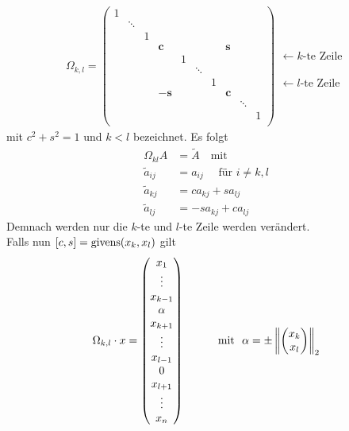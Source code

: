 \begin{gather}
  \Omega _{k,l} = \begin{pmatrix}
    1 &&&&&&&&& \\
    & \ddots\\
    && 1\\
    &&& \mathbf{c} &&&& \mathbf{s} \\
    &&&& 1\\
    &&&&& \ddots \\
    &&&&&& 1\\
    &&& -\mathbf{s} &&&& \mathbf{c} \\
    &&&&&&&& \ddots \\
    &&&&&&&&& 1\\
  \end{pmatrix}
  \begin{array}{l}
    \\   \leftarrow \text{$k$-te Zeile}
    \\ \\ \\ \\ \leftarrow \text{$l$-te Zeile}
  \end{array}
  \label{IV.4.5}
\end{gather}
mit $c^2+s^2=1$ und $k<l$ bezeichnet.
Es folgt
\begin{align*}
  \Omega_{kl} A &= \widetilde{A} \quad \text{mit} \\
  \widetilde{a}_{ij}  &= a_{ij} \quad \text{ für } i\neq k,l \\
  \widetilde{a}_{kj} & = ca_{kj}+sa_{lj} \\
  \widetilde{a}_{lj} & = -sa_{kj} + ca_{lj}
\end{align*}
Demnach werden nur die $k$-te und $l$-te Zeile werden verändert. \\
Falls nun $[c,s] = \operatorname{givens}(x_k, x_l)$ gilt
\begin{gather}
  \Omega_{k,l}\cdot x = \begin{pmatrix}
    x_1 \\ \vdots\\x_{k-1} \\\alpha \\ x_{k+1}
    \\\vdots \\
    x_{l-1} \\ 0 \\x_{l+1} \\\vdots \\x_n
  \end{pmatrix}
  \qquad
  \quad \text{mit~~}
  \alpha = \pm \nn[  \begin{pmatrix} x_k \\ x_l\end{pmatrix}]_2
  \label{IV.4.6}
\end{gather}

